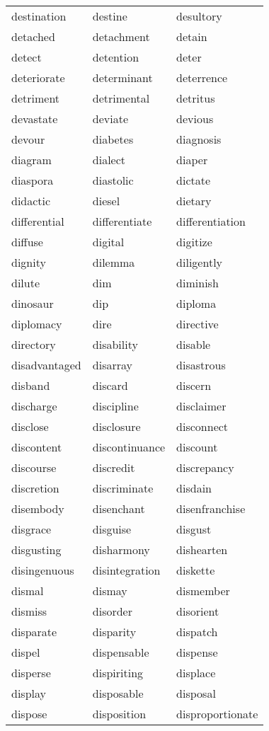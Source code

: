 \documentclass{minimal}
\begin{document}
\begin{longtable}{p{2.8cm}p{2.8cm}p{2.8cm}}
destination & destine & desultory \\
detached & detachment & detain \\
detect & detention & deter \\
deteriorate & determinant & deterrence \\
detriment & detrimental & detritus \\
devastate & deviate & devious \\
devour & diabetes & diagnosis \\
diagram & dialect & diaper \\
diaspora & diastolic & dictate \\
didactic & diesel & dietary \\
differential & differentiate & differentiation \\
diffuse & digital & digitize \\
dignity & dilemma & diligently \\
dilute & dim & diminish \\
dinosaur & dip & diploma \\
diplomacy & dire & directive \\
directory & disability & disable \\
disadvantaged & disarray & disastrous \\
disband & discard & discern \\
discharge & discipline & disclaimer \\
disclose & disclosure & disconnect \\
discontent & discontinuance & discount \\
discourse & discredit & discrepancy \\
discretion & discriminate & disdain \\
disembody & disenchant & disenfranchise \\
disgrace & disguise & disgust \\
disgusting & disharmony & dishearten \\
disingenuous & disintegration & diskette \\
dismal & dismay & dismember \\
dismiss & disorder & disorient \\
disparate & disparity & dispatch \\
dispel & dispensable & dispense \\
disperse & dispiriting & displace \\
display & disposable & disposal \\
dispose & disposition & disproportionate \\

\end{longtable}
\end{document}
